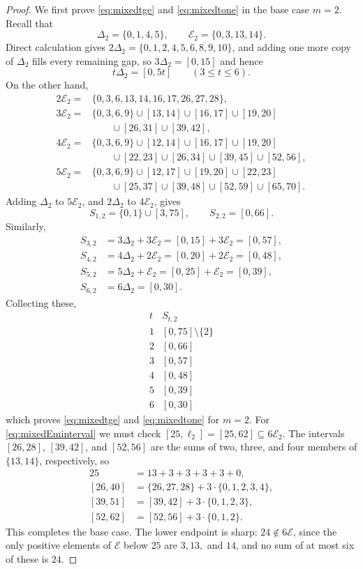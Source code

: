\documentclass[12pt]{article}
\theoremstyle{plain}
\theoremstyle{definition}
\theoremstyle{plain}
\begin{document}
\begin{proof}
We first prove \eqref{eq:mixedtge} and \eqref{eq:mixedtone} in the base
case $m=2$.  Recall that
\[
 \Delta_2=\{0,1,4,5\},\qquad \mathcal E_2=\{0,3,13,14\}.
\]
Direct calculation gives $2\Delta_2=\{0,1,2,4,5,6,8,9,10\}$, and adding one
more copy of $\Delta_2$ fills every remaining gap, so $3\Delta_2=[0,15]$ and hence
\[
 t\Delta_2=[0,5t]\qquad(3\leq t\leq6).
\]
On the other hand,
\[
\begin{aligned}
2\mathcal E_2
={}&\{0,3,6,13,14,16,17,26,27,28\},\\[1ex]
3\mathcal E_2
={}&\{0,3,6,9\}\cup[13,14]\cup[16,17]\cup[19,20]\\
&\qquad\cup[26,31]\cup[39,42],\\[1ex]
4\mathcal E_2
={}&\{0,3,6,9\}\cup[12,14]\cup[16,17]\cup[19,20]\\
&\qquad\cup[22,23]\cup[26,34]\cup[39,45]\cup[52,56],\\[1ex]
5\mathcal E_2
={}&\{0,3,6,9\}\cup[12,17]\cup[19,20]\cup[22,23]\\
&\qquad\cup[25,37]\cup[39,48]\cup[52,59]\cup[65,70].
\end{aligned}
\]
Adding $\Delta_2$ to $5\mathcal E_2$, and $2\Delta_2$ to $4\mathcal E_2$, gives
\[
 S_{1,2}=\{0,1\}\cup[3,75],\qquad S_{2,2}=[0,66].
\]
Similarly,
\[
\begin{aligned}
S_{3,2}&=3\Delta_2+3\mathcal E_2=[0,15]+3\mathcal E_2=[0,57],\\[1ex]
S_{4,2}&=4\Delta_2+2\mathcal E_2=[0,20]+2\mathcal E_2=[0,48],\\[1ex]
S_{5,2}&=5\Delta_2+\mathcal E_2 =[0,25]+\mathcal E_2 =[0,39],\\[1ex]
S_{6,2}&=6\Delta_2=[0,30].
\end{aligned}
\]
Collecting these,
\[
\begin{array}{c|c}
t&S_{t,2}\\ \hline
1&[0,75]\setminus\{2\}\\
2&[0,66]\\
3&[0,57]\\
4&[0,48]\\
5&[0,39]\\
6&[0,30]
\end{array}
\]
which proves \eqref{eq:mixedtge} and \eqref{eq:mixedtone} for $m=2$.
For \eqref{eq:mixedEminterval} we must check
$[25,\ell_2]=[25,62]\subseteq6\mathcal E_2$.  The intervals $[26,28]$,
$[39,42]$, and $[52,56]$ are the sums of two, three, and four members of
$\{13,14\}$, respectively, so
\[
\begin{aligned}
25&=13+3+3+3+3+0,\\
[26,40]&=\{26,27,28\}+3\cdot\{0,1,2,3,4\},\\
[39,51]&=[39,42]+3\cdot\{0,1,2,3\},\\
[52,62]&=[52,56]+3\cdot\{0,1,2\}.
\end{aligned}
\]
This completes the base case.  The lower endpoint is sharp:
$24\notin6\mathcal E$, since the only positive elements of $\mathcal E$
below $25$ are $3,13,$ and $14$, and no sum of at most six of these is
$24$.


\end{proof}
\end{document}
